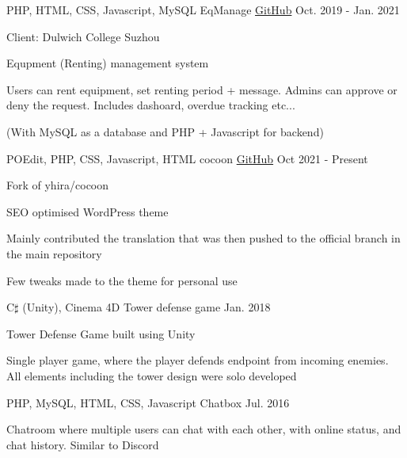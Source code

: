 \begin{cventries}
  \cventry
    {PHP, HTML, CSS, Javascript, MySQL} 
    {EqManage} 
    {\href{https://github.com/YukiKume/EqManage}{GitHub}} %
    {Oct. 2019 - Jan. 2021} 
    {
      \begin{cvitems}
        \item {Client: Dulwich College Suzhou}
        \item {Equpment (Renting) management system}
        \item {Users can rent equipment, set renting period + message. Admins can approve or deny the request. Includes dashoard, overdue tracking etc...}
        \item (With MySQL as a database and PHP + Javascript for backend)
      \end{cvitems}
    }

  \cventry
  {POEdit, PHP, CSS, Javascript, HTML}
  {cocoon}
  {\href{https://github.com/WrenHainsworth/cocoon}{GitHub}} %
  {Oct 2021 - Present}
  {
    \begin{cvitems}
      \item {Fork of yhira/cocoon}
      \item {SEO optimised WordPress theme}
      \item {Mainly contributed the translation that was then pushed to the official branch in the main repository}
      \item {Few tweaks made to the theme for personal use}
    \end{cvitems}
  }


  \cventry
  {C$\sharp$ (Unity), Cinema 4D} 
  {Tower defense game} 
  {} %
  {Jan. 2018} 
  {
    \begin{cvitems}
      \item {Tower Defense Game built using Unity}
      \item {Single player game, where the player defends endpoint from incoming enemies. All elements including the tower design were solo developed}
    \end{cvitems}
  }

  \cventry
  {PHP, MySQL, HTML, CSS, Javascript} 
  {Chatbox} 
  {} %
  {Jul. 2016} 
  {
    \begin{cvitems}
      \item {Chatroom where multiple users can chat with each other, with online status, and chat history. Similar to Discord}
    \end{cvitems}
  }

\end{cventries}
